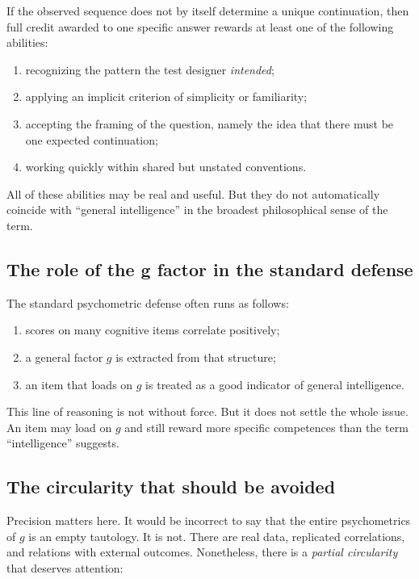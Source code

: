 \documentclass[10pt, a4paper]{article}
\theoremstyle{plain}
\theoremstyle{definition}
\theoremstyle{remark}
\begin{document}
If the observed sequence does not by itself determine a unique continuation,
then full credit awarded to one specific answer rewards at least one of the
following abilities:
\begin{enumerate}[label=\arabic*.]
    \item recognizing the pattern the test designer \emph{intended};
    \item applying an implicit criterion of simplicity or familiarity;
    \item accepting the framing of the question, namely the idea that there must
          be one expected continuation;
    \item working quickly within shared but unstated conventions.
\end{enumerate}

All of these abilities may be real and useful. But they do not automatically
coincide with ``general intelligence'' in the broadest philosophical sense of
the term.

\subsection{The role of the g factor in the standard defense}

The standard psychometric defense often runs as follows:
\begin{enumerate}[label=\arabic*.]
    \item scores on many cognitive items correlate positively;
    \item a general factor $g$ is extracted from that structure;
    \item an item that loads on $g$ is treated as a good indicator of general
          intelligence.
\end{enumerate}

This line of reasoning is not without force. But it does not settle the whole
issue. An item may load on $g$ and still reward more specific competences than
the term ``intelligence'' suggests.

\subsection{The circularity that should be avoided}

Precision matters here. It would be incorrect to say that the entire
psychometrics of $g$ is an empty tautology. It is not. There are real data,
replicated correlations, and relations with external outcomes. Nonetheless,
there is a \emph{partial circularity} that deserves attention:
\end{document}
